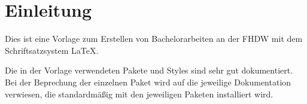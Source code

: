 \section{Einleitung}

Dies ist eine Vorlage zum Erstellen von Bachelorarbeiten an der FHDW mit dem
Schriftsatzsystem {\LaTeX}.

Die in der Vorlage verwendeten Pakete und Styles sind sehr gut dokumentiert. Bei
der Beprechung der einzelnen Paket wird auf die jeweilige Dokumentation verwiesen, die standardmäßig mit den jeweiligen Paketen installiert wird.

